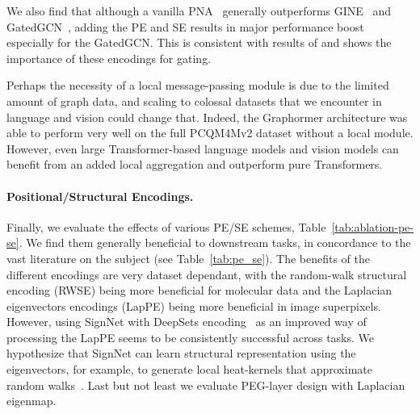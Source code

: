\documentclass{article}
\begin{document}
We also find that although a vanilla PNA~\cite{corso2020principal_pna} generally outperforms GINE~\cite{hu2019strategies_GINE} and GatedGCN~\cite{bresson2017GatedGCN}, adding the PE and SE results in major performance boost especially for the GatedGCN. This is consistent with results of \citet{dwivedi2022LPE} and shows the importance of these encodings for gating.

Perhaps the necessity of a local message-passing module is due to the limited amount of graph data, and scaling to colossal datasets \cite{raffel2020t5} that we encounter in language and vision could change that. Indeed, the Graphormer architecture \cite{ying2021graphormer} was able to perform very well on the full PCQM4Mv2 dataset without a local module. However, even large Transformer-based language models \cite{chelombiev2021groupbert} and vision models \cite{han2022survey_vision_transformer} can benefit from an added local aggregation and outperform pure Transformers.


\paragraph{Positional/Structural Encodings.}
Finally, we evaluate the effects of various PE/SE schemes, Table~\ref{tab:ablation-pe-se}. We find them generally beneficial to downstream tasks, in concordance to the vast literature on the subject (see Table~\ref{tab:pe_se}). The benefits of the different encodings are very dataset dependant, with the random-walk structural encoding (RWSE) being more beneficial for molecular data and the Laplacian eigenvectors encodings (LapPE) being more beneficial in image superpixels. However, using SignNet with DeepSets encoding~\cite{lim2022sign} as an improved way of processing the LapPE seems to be consistently successful across tasks. We hypothesize that SignNet can learn structural representation using the eigenvectors, for example, to generate local heat-kernels that approximate random walks~\cite{andres2016heat}. Last but not least we evaluate PEG-layer design \cite{wang2022equivstable} with Laplacian eigenmap. %



\end{document}
